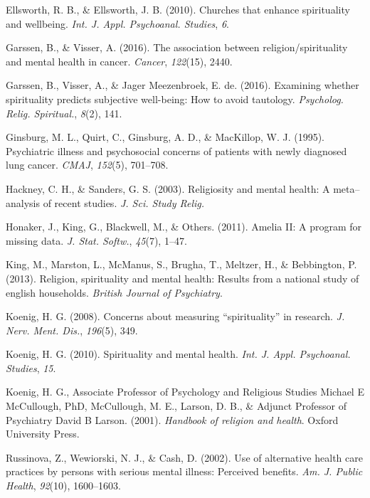 \documentclass[
  english,
  man]{apa6}
\begin{document}
\leavevmode\hypertarget{ref-Ellsworth2010-yu}{}%
Ellsworth, R. B., \& Ellsworth, J. B. (2010). Churches that enhance spirituality and wellbeing. \emph{Int. J. Appl. Psychoanal. Studies}, \emph{6}.

\leavevmode\hypertarget{ref-Garssen2016-km}{}%
Garssen, B., \& Visser, A. (2016). The association between religion/spirituality and mental health in cancer. \emph{Cancer}, \emph{122}(15), 2440.

\leavevmode\hypertarget{ref-Garssen2016-kb}{}%
Garssen, B., Visser, A., \& Jager Meezenbroek, E. de. (2016). Examining whether spirituality predicts subjective well-being: How to avoid tautology. \emph{Psycholog. Relig. Spiritual.}, \emph{8}(2), 141.

\leavevmode\hypertarget{ref-Ginsburg1995-jr}{}%
Ginsburg, M. L., Quirt, C., Ginsburg, A. D., \& MacKillop, W. J. (1995). Psychiatric illness and psychosocial concerns of patients with newly diagnosed lung cancer. \emph{CMAJ}, \emph{152}(5), 701--708.

\leavevmode\hypertarget{ref-Hackney2003-rs}{}%
Hackney, C. H., \& Sanders, G. S. (2003). Religiosity and mental health: A meta--analysis of recent studies. \emph{J. Sci. Study Relig.}

\leavevmode\hypertarget{ref-Honaker2011-yu}{}%
Honaker, J., King, G., Blackwell, M., \& Others. (2011). Amelia II: A program for missing data. \emph{J. Stat. Softw.}, \emph{45}(7), 1--47.

\leavevmode\hypertarget{ref-King2013-cg}{}%
King, M., Marston, L., McManus, S., Brugha, T., Meltzer, H., \& Bebbington, P. (2013). Religion, spirituality and mental health: Results from a national study of english households. \emph{British Journal of Psychiatry}.

\leavevmode\hypertarget{ref-Koenig2008-lv}{}%
Koenig, H. G. (2008). Concerns about measuring ``spirituality'' in research. \emph{J. Nerv. Ment. Dis.}, \emph{196}(5), 349.

\leavevmode\hypertarget{ref-Koenig2010-gk}{}%
Koenig, H. G. (2010). Spirituality and mental health. \emph{Int. J. Appl. Psychoanal. Studies}, \emph{15}.

\leavevmode\hypertarget{ref-Koenig2001-ow}{}%
Koenig, H. G., Associate Professor of Psychology and Religious Studies Michael E McCullough, PhD, McCullough, M. E., Larson, D. B., \& Adjunct Professor of Psychiatry David B Larson. (2001). \emph{Handbook of religion and health}. Oxford University Press.

\leavevmode\hypertarget{ref-Russinova2002-rq}{}%
Russinova, Z., Wewiorski, N. J., \& Cash, D. (2002). Use of alternative health care practices by persons with serious mental illness: Perceived benefits. \emph{Am. J. Public Health}, \emph{92}(10), 1600--1603.
\end{document}
